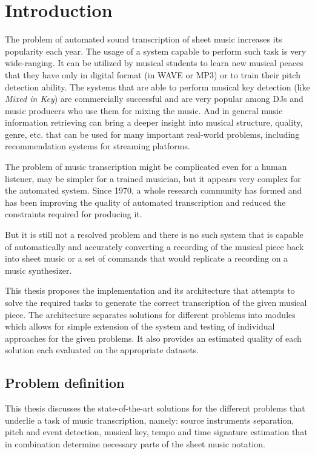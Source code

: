 \chapter{Introduction}\label{ch:introduction}

The problem of automated sound transcription of sheet music increases its popularity each year. The usage of a system
capable to perform such task is very wide-ranging. It can be utilized by musical students to learn new musical peaces
that they have only in digital format (in \ac{WAVE} or MP3) or to train their pitch detection ability. The systems that
are able to perform musical key detection (like \textit{Mixed in Key}\cite{mixed-in-keys}) are commercially successful
and are very popular among DJs and music producers who use them for mixing the music. And in general music information
retrieving can bring a deeper insight into musical structure, quality, genre, etc. that can be used for many important
real-world problems, including recommendation systems for streaming platforms.

The problem of music transcription might be complicated even for a human listener, may be simpler for a trained
musician, but it appears very complex for the automated system. Since 1970, a whole research community has formed
and has been improving the quality of automated transcription and reduced the constraints required for producing it.

But it is still not a resolved problem and there is no such system that is capable of automatically and accurately
converting a recording of the musical piece back into sheet music or a set of commands that would replicate a recording
on a music synthesizer.

This thesis proposes the implementation and its architecture that attempts to solve the required tasks to generate
the correct transcription of the given musical piece. The architecture separates solutions for different problems into
modules which allows for simple extension of the system and testing of individual approaches for the given problems.
It also provides an estimated quality of each solution each evaluated on the appropriate datasets.

\section{Problem definition}\label{sec:problem-definition}

This thesis discusses the state-of-the-art solutions for the different problems that underlie a task of music
transcription, namely: source instruments separation, pitch and event detection, musical key, tempo and time signature
estimation that in combination determine necessary parts of the sheet music notation.

